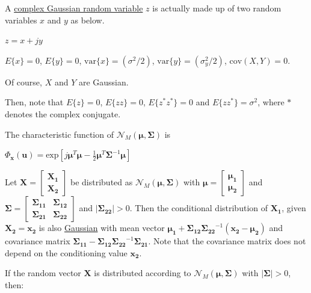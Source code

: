 \documentclass[fleqn]{article}
\begin{document}
	A \underline{complex Gaussian random variable} $z$ is actually made up of two random variables $x$ and $y$ as below.
	
	$z = x + jy$
	
	$E\{x\} = 0$, $E\{y\} = 0$, $\text{var}\{x\} = (\sigma^2/2)$, $\text{var}\{y\} = (\sigma_y^2/2)$, $\text{cov}(X,Y) = 0$.
	
	Of course, $X$ and $Y$ are Gaussian.
	
	Then, note that $E\{z\} = 0$, $E\{zz\} = 0$, $E\{z^*z^*\} = 0$ and $E\{zz^*\} = \sigma^2$, where $*$ denotes the complex conjugate.
	
	The characteristic function of $\mathcal{N}_M(\boldsymbol{\mu}, \mathbf{\Sigma})$ is
	
	$\Phi_\mathbf{x}(\mathbf{u}) = \text{exp}[j\boldsymbol{\mu}^T\boldsymbol{\mu} - \frac{1}{2}\boldsymbol{\mu}^T\mathbf{\Sigma}^{-1}\boldsymbol{\mu}]$
	
	Let $\mathbf{X} = \begin{bmatrix}\mathbf{X_1} \\ \mathbf{X_2} \end{bmatrix}$ be distributed as $\mathcal{N}_M(\boldsymbol{\mu},\mathbf{\Sigma})$ with $\boldsymbol{\mu} = \begin{bmatrix} \mathbf{\boldsymbol{\mu}_1} \\ \mathbf{\boldsymbol{\mu}_2} \end{bmatrix}$ and $\mathbf{\Sigma} = \begin{bmatrix} \mathbf{\Sigma_{11}} & \mathbf{\Sigma_{12}} \\ \mathbf{\Sigma_{21}} & \mathbf{\Sigma_{22}} \end{bmatrix}$ and $|\mathbf{\Sigma_22}| > 0$. Then the conditional distribution of $\mathbf{X_1}$, given $\mathbf{X_2} = \mathbf{x_2}$ is also \underline{Gaussian} with mean vector $\mathbf{\boldsymbol{\mu}_1} + \mathbf{\Sigma_{12}}\mathbf{\Sigma_{22}}^{-1}(\mathbf{x_2} - \mathbf{\boldsymbol{\mu}_2})$ and covariance matrix $\mathbf{\Sigma_{11}} - \mathbf{\Sigma_{12}}\mathbf{\Sigma_{22}}^{-1}\mathbf{\Sigma_{21}}$. Note that the covariance matrix does not depend on the conditioning value $\mathbf{x_2}$.
	
	If the random vector $\mathbf{X}$ is distributed according to $\mathcal{N}_M(\boldsymbol{\mu},\mathbf{\Sigma})$ with $|\mathbf{\Sigma}| > 0$, then:
	
\end{document}

